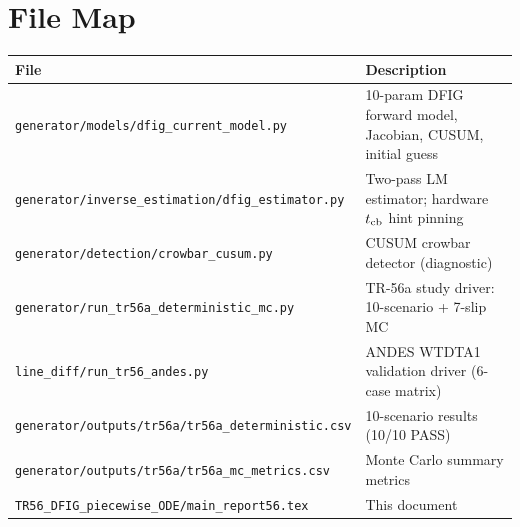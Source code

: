 \documentclass[11pt,a4paper]{article}
\begin{document}
\appendix
\section{File Map}
\label{app:files}

\begin{tabular}{p{}p{}}
  \toprule
  File & Description \\
  \midrule
  \texttt{generator/models/dfig\_current\_model.py}
    & 10-param DFIG forward model, Jacobian, CUSUM, initial guess \\
  \texttt{generator/inverse\_estimation/dfig\_estimator.py}
    & Two-pass LM estimator; hardware $t_{\rm cb}$ hint pinning \\
  \texttt{generator/detection/crowbar\_cusum.py}
    & CUSUM crowbar detector (diagnostic) \\
  \texttt{generator/run\_tr56a\_deterministic\_mc.py}
    & TR-56a study driver: 10-scenario + 7-slip MC \\
  \texttt{line\_diff/run\_tr56\_andes.py}
    & ANDES WTDTA1 validation driver (6-case matrix) \\
  \texttt{generator/outputs/tr56a/tr56a\_deterministic.csv}
    & 10-scenario results (10/10 PASS) \\
  \texttt{generator/outputs/tr56a/tr56a\_mc\_metrics.csv}
    & Monte Carlo summary metrics \\
  \texttt{TR56\_DFIG\_piecewise\_ODE/main\_report56.tex}
    & This document \\
  \bottomrule
\end{tabular}



\end{document}
